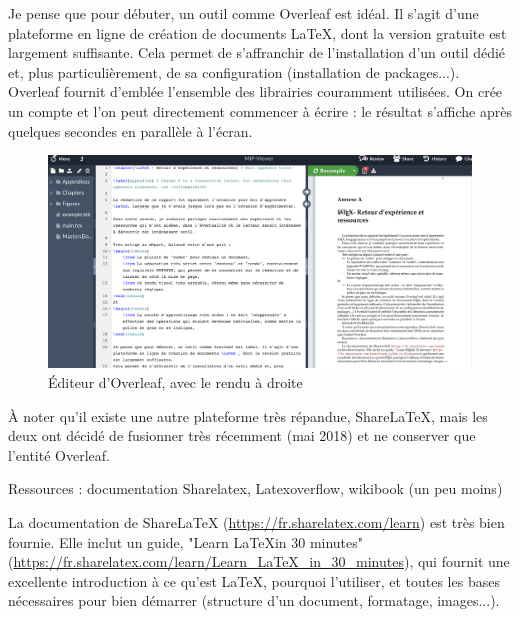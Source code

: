 Je pense que pour débuter, un outil comme Overleaf est idéal. Il s'agit d'une plateforme en ligne de création de documents \LaTeX , dont la version gratuite est largement suffisante.
Cela permet de s'affranchir de l'installation d'un outil dédié et, plus particulièrement, de sa configuration (installation de packages...). Overleaf fournit d'emblée l'ensemble des librairies couramment utilisées.
On crée un compte et l'on peut directement commencer à écrire : le résultat s'affiche après quelques secondes en parallèle à l'écran.

\begin{figure}
    \centering
    \includegraphics[width=\linewidth]{Figures/overleaf-editor.png}
    \caption{Éditeur d'Overleaf, avec le rendu à droite}
    \label{fig:overleaf-editor}
\end{figure}

À noter qu'il existe une autre plateforme très répandue, ShareLaTeX, mais les deux ont décidé de fusionner très récemment (mai 2018) et ne conserver que l'entité Overleaf.


Ressources : documentation Sharelatex, Latexoverflow, wikibook (un peu moins)

La documentation de ShareLaTeX (\url{https://fr.sharelatex.com/learn}) est très bien fournie. Elle inclut un guide, "Learn \LaTeX in 30 minutes" (\url{https://fr.sharelatex.com/learn/Learn_LaTeX_in_30_minutes}), qui fournit une excellente introduction à ce qu'est \LaTeX, pourquoi l'utiliser, et toutes les bases nécessaires pour bien démarrer (structure d'un document, formatage, images...).
